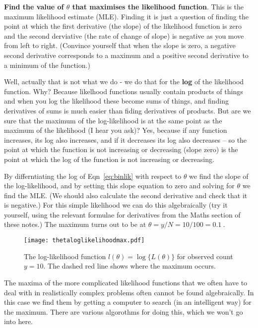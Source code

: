 \item \textbf{Find the value of $\theta$ that maximises the likelihood function}. This is the maximum likelihood estimate (MLE). Finding it is just a question of finding the point at which the first derivative (the slope) of the likelihood function is zero and the second derviative (the rate of change of slope) is negative as you move from left to right. (Convince yourself that when the slope is zero, a negative second derivative corresponds to a maximum and a positive second derivative to a minimum of the function.)

Well, actually that is not what we do - we do that for the \textbf{log} of the likelihood function. Why? Because likelhood functions usually contain products of things and when you log the likelihood these become sums of things, and finding derivatives of sums is much easier than fiding derivatives of products. But are we sure that the maximum of the log-likelihood is at the same point as the maximum of the likelihood (I hear you ask)? Yes, because if any function increases, its log also increases, and if it decreases its log also decreases -- so the point at which the function is not increasing or decreasing (slope zero) is the point at which the log of the function is not increasing or decreasing.

By differntiating the log of Eqn~\eqref{eq:binlik} with respect to $\theta$ we find the slope of the log-likelihood, and by setting this slope equation to zero and solving for $\theta$ we find the MLE. (We should also calculate the second derivative and check that it is negative.) For this simple likelihood we can do this algebraically (try it yourself, using the relevant formulae for derivatives from the Maths section of these notes.) The maximum turns out to be at $\theta=y/N=10/100=0.1~$.

\begin{figure}[ht!]
\caption{\small The log-likelihood function $l(\theta)=\log\{L(\theta)\}$ for observed count $y=10$. The dashed red line shows where the maximum occurs.}
\centering
\texttt{[image: thetaloglikelihoodmax.pdf]}
\label{fig:thetaloglikelihoodmax}
\end{figure}

The maxima of the more complicated likelihood functions that we often have to deal with in realistically complex problems often cannot be found algebraically. In this case we find them by getting a computer to search (in an intelligent way) for the maximum. There are various algorothms for doing this, which we won't go into here.

